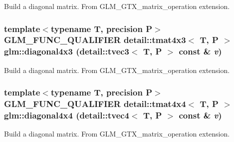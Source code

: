 Build a diagonal matrix. From GLM\_\-GTX\_\-matrix\_\-operation extension. \hypertarget{group__gtx__matrix__operation_g9b918f5e6a6224398447d2c79861d8fd}{
\subsubsection[diagonal4x3]{\setlength{\rightskip}{0pt plus 5cm}template$<$typename T, precision P$>$ GLM\_\-FUNC\_\-QUALIFIER detail::tmat4x3$<$ T, P $>$ glm::diagonal4x3 (detail::tvec3$<$ T, P $>$ const \& {\em v})}}
\label{group__gtx__matrix__operation_g9b918f5e6a6224398447d2c79861d8fd}


Build a diagonal matrix. From GLM\_\-GTX\_\-matrix\_\-operation extension. \hypertarget{group__gtx__matrix__operation_g32c8da8ef592e0c0891d1593ffb524db}{
\subsubsection[diagonal4x4]{\setlength{\rightskip}{0pt plus 5cm}template$<$typename T, precision P$>$ GLM\_\-FUNC\_\-QUALIFIER detail::tmat4x4$<$ T, P $>$ glm::diagonal4x4 (detail::tvec4$<$ T, P $>$ const \& {\em v})}}
\label{group__gtx__matrix__operation_g32c8da8ef592e0c0891d1593ffb524db}


Build a diagonal matrix. From GLM\_\-GTX\_\-matrix\_\-operation extension. 
